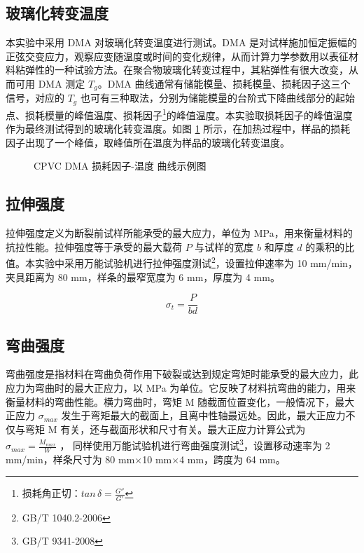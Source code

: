 \documentclass[a4paper, oneside, onecolumn, 12pt]{ctexrep}    %
\begin{document}
\subsection{玻璃化转变温度}
本实验中采用 DMA 对玻璃化转变温度进行测试。DMA 是对试样施加恒定振幅的正弦交变应力，观察应变随温度或时间的变化规律，从而计算力学参数用以表征材料粘弹性的一种试验方法。在聚合物玻璃化转变过程中，其粘弹性有很大改变，从而可用 DMA 测定 $T_g$。DMA 曲线通常有储能模量、损耗模量、损耗因子这三个信号，对应的 $T_g$ 也可有三种取法，分别为储能模量的台阶式下降曲线部分的起始点、损耗模量的峰值温度、损耗因子\footnote{损耗角正切：$tan \, \delta = \frac{G''}{G'}$}的峰值温度。本实验取损耗因子的峰值温度作为最终测试得到的玻璃化转变温度。如图 \ref{figExTg} 所示，在加热过程中，样品的损耗因子出现了一个峰值，取峰值所在温度为样品的玻璃化转变温度。

\begin{figure}[htbp]
    \begin{center}
        
    \end{center}
    \caption{CPVC DMA 损耗因子-温度 曲线示例图}
    \label{figExTg}
\end{figure}

\subsection{拉伸强度}
拉伸强度定义为断裂前试样所能承受的最大应力，单位为 MPa，用来衡量材料的抗拉性能。拉伸强度等于承受的最大载荷 $P$ 与试样的宽度 $b$ 和厚度 $d$ 的乘积的比值。本实验中采用万能试验机进行拉伸强度测试\footnote{GB/T 1040.2-2006}，设置拉伸速率为 10 mm/min，夹具距离为 80 mm，样条的最窄宽度为 6 mm，厚度为 4 mm。

\begin{equation}
\sigma_t = \frac{P}{bd}
\end{equation}

\subsection{弯曲强度}
弯曲强度是指材料在弯曲负荷作用下破裂或达到规定弯矩时能承受的最大应力，此应力为弯曲时的最大正应力，以 MPa 为单位。它反映了材料抗弯曲的能力，用来衡量材料的弯曲性能。横力弯曲时，弯矩 M 随截面位置变化，一般情况下，最大正应力 $\sigma_{max}$ 发生于弯矩最大的截面上，且离中性轴最远处。因此，最大正应力不仅与弯矩 M 有关，还与截面形状和尺寸有关。最大正应力计算公式为 $\sigma_{max} = \frac{M_{max}}{W}$ ，
同样使用万能试验机进行弯曲强度测试\footnote{GB/T 9341-2008}，设置移动速率为 2 mm/min，样条尺寸为 80 mm$\times$10 mm$\times$4 mm，跨度为 64 mm。
\end{document}

